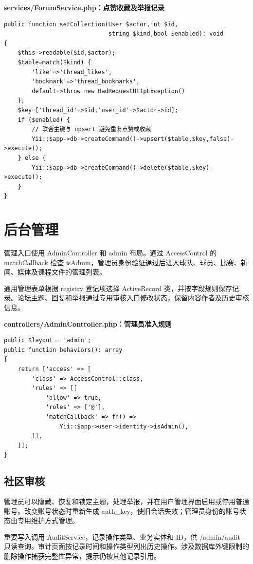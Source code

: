 \documentclass[UTF8,a4paper,11pt]{ctexart}
\begin{document}
\noindent\textbf{services/ForumService.php：点赞收藏及举报记录}\par\vspace{2pt}
\begin{lstlisting}
public function setCollection(User $actor,int $id,
                              string $kind,bool $enabled): void
{
    $this->readable($id,$actor);
    $table=match($kind) {
        'like'=>'thread_likes',
        'bookmark'=>'thread_bookmarks',
        default=>throw new BadRequestHttpException()
    };
    $key=['thread_id'=>$id,'user_id'=>$actor->id];
    if ($enabled) {
        // 联合主键与 upsert 避免重复点赞或收藏
        Yii::$app->db->createCommand()->upsert($table,$key,false)->execute();
    } else {
        Yii::$app->db->createCommand()->delete($table,$key)->execute();
    }
}
\end{lstlisting}

\section{后台管理}
管理入口使用 AdminController 和 admin 布局。通过 AccessControl 的 matchCallback 检查 isAdmin，管理员身份验证通过后进入球队、球员、比赛、新闻、媒体及课程文件的管理列表。

通用管理表单根据 registry 登记项选择 ActiveRecord 类，并按字段规则保存记录。论坛主题、回复和举报通过专用审核入口修改状态，保留内容作者及历史审核信息。

\noindent\textbf{controllers/AdminController.php：管理员准入规则}\par\vspace{2pt}
\begin{lstlisting}
public $layout = 'admin';
public function behaviors(): array
{
    return ['access' => [
        'class' => AccessControl::class,
        'rules' => [[
            'allow' => true,
            'roles' => ['@'],
            'matchCallback' => fn() =>
                Yii::$app->user->identity->isAdmin(),
        ]],
    ]];
}
\end{lstlisting}
\subsection{社区审核}
管理员可以隐藏、恢复和锁定主题，处理举报，并在用户管理界面启用或停用普通账号。改变账号状态时重新生成 auth\_key，使旧会话失效；管理员身份的账号状态由专用维护方式管理。

重要写入调用 AuditService，记录操作类型、业务实体和 ID，供 /admin/audit 只读查询。审计页面按记录时间和操作类型列出历史操作。涉及数据库外键限制的删除操作捕获完整性异常，提示仍被其他记录引用。
\end{document}
